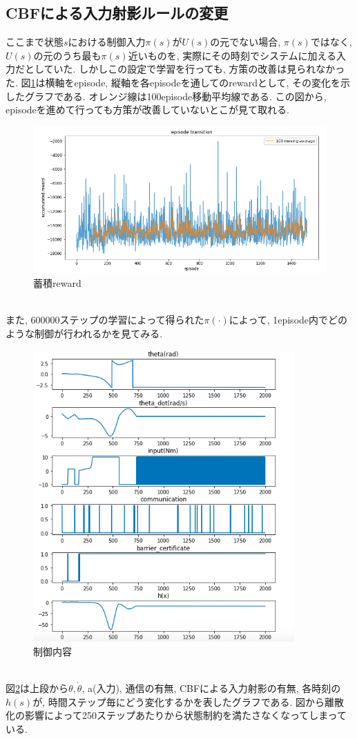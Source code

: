 \documentclass{jsarticle}
\begin{document}
\subsection{CBFによる入力射影ルールの変更}
ここまで状態$s$における制御入力$\pi(s)$が$U(s)$の元でない場合, $\pi(s)$ではなく, $U(s)$の元のうち最も$\pi(s)$近いものを, 実際にその時刻でシステムに加える入力だとしていた. しかしこの設定で学習を行っても, 方策の改善は見られなかった. 図\ref{pure_reward}は横軸をepisode, 縦軸を各episodeを通してのrewardとして, その変化を示したグラフである. オレンジ線は100episode移動平均線である. この図から, episodeを進めて行っても方策が改善していないとこが見て取れる.
\begin{figure}[h]
	\centering
 	\includegraphics[width=12cm]{pure_reward.png}
 	\caption{蓄積reward} \label{pure_reward}
\end{figure}\\

また, 600000ステップの学習によって得られた$\pi(\cdot)$によって, 1episode内でどのような制御が行われるかを見てみる. 
\begin{figure}[h]
	\centering
 	\includegraphics[width=10cm]{pure_control_log.png}
 	\caption{制御内容} \label{pure_control_log}
\end{figure}\\
図\ref{pure_control_log}は上段から$\theta, \dot{\theta}$, a(入力), 通信の有無, CBFによる入力射影の有無, 各時刻の$h(s)$が, 時間ステップ毎にどう変化するかを表したグラフである. 図から離散化の影響によって250ステップあたりから状態制約を満たさなくなってしまっている. \par
\end{document}
